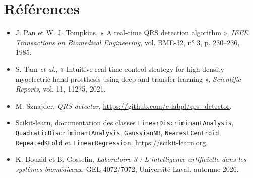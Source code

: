 \documentclass[11pt,letterpaper]{article}
\begin{document}
\section*{Références}
\begin{itemize}\sloppy
\item J. Pan et W. J. Tompkins, « A real-time QRS detection algorithm », \emph{IEEE Transactions on Biomedical Engineering}, vol. BME-32, n° 3, p. 230--236, 1985.
\item S. Tam \emph{et al.}, « Intuitive real-time control strategy for high-density myoelectric hand prosthesis using deep and transfer learning », \emph{Scientific Reports}, vol. 11, 11275, 2021.
\item M. Sznajder, \emph{QRS detector}, \url{https://github.com/c-labpl/qrs_detector}.
\item Scikit-learn, documentation des classes \texttt{LinearDiscriminantAnalysis}, \texttt{QuadraticDiscriminantAnalysis}, \texttt{GaussianNB}, \texttt{NearestCentroid}, \texttt{RepeatedKFold} et \texttt{LinearRegression}, \url{https://scikit-learn.org}.
\item K. Bouzid et B. Gosselin, \emph{Laboratoire 3 : L'intelligence artificielle dans les systèmes biomédicaux}, GEL-4072/7072, Université Laval, automne 2026.
\end{itemize}
\end{document}
